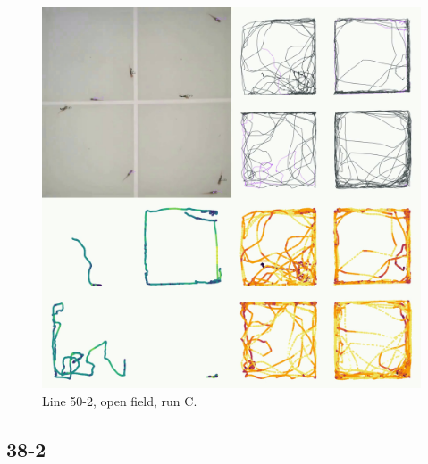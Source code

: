 \documentclass[
]{book}
\begin{document}
\begin{figure}
\includegraphics[width=1\linewidth]{figs/mikk_behaviour/four_panel_plots/open_field_20191120_1150_50-2_R_C_300} \caption{Line 50-2, open field, run C.}\label{fig:4p-50-2-of-C}
\end{figure}

\hypertarget{section-3}{%
\subsection{38-2}\label{section-3}}
\end{document}
